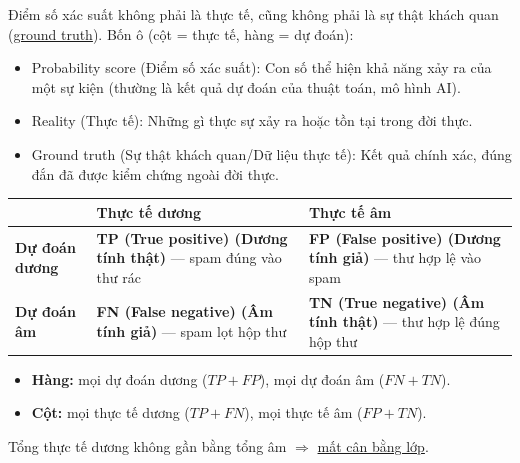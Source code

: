 \documentclass[12pt,a4paper]{article}
\begin{document}
\begin{dinhnghia}[title={Confusion matrix}]
  Điểm số xác suất không phải là thực tế, cũng không phải là sự thật khách quan (\href{https://developers.google.com/machine-learning/glossary\#ground_truth}{ground truth}). Bốn ô (cột = thực tế, hàng = dự đoán):
  \begin{itemize}
    \item Probability score (Điểm số xác suất): Con số thể hiện khả năng xảy ra của một sự kiện (thường là kết quả dự đoán của thuật toán, mô hình AI).
    \item Reality (Thực tế): Những gì thực sự xảy ra hoặc tồn tại trong đời thực.
    \item Ground truth (Sự thật khách quan/Dữ liệu thực tế): Kết quả chính xác, đúng đắn đã được kiểm chứng ngoài đời thực.
  \end{itemize}
\end{dinhnghia}

\begin{congthuc}[title={Ma trận nhầm lẫn (spam)}]
\begin{tabularx}{\textwidth}{@{}l >{\raggedright\arraybackslash}X >{\raggedright\arraybackslash}X@{}}
 & \textbf{Thực tế dương} & \textbf{Thực tế âm} \\
\midrule
\textbf{Dự đoán dương} &
\textbf{TP (True positive) (Dương tính thật)} --- spam đúng vào thư rác &
\textbf{FP (False positive) (Dương tính giả)} --- thư hợp lệ vào spam \\
\textbf{Dự đoán âm} &
\textbf{FN (False negative) (Âm tính giả)} --- spam lọt hộp thư &
\textbf{TN (True negative) (Âm tính thật)} --- thư hợp lệ đúng hộp thư \\
\end{tabularx}
\end{congthuc}

\begin{tinhchat}[title={Tổng theo hàng và cột}]
\begin{itemize}
  \item \textbf{Hàng:} mọi dự đoán dương ($TP+FP$), mọi dự đoán âm ($FN+TN$).
  \item \textbf{Cột:} mọi thực tế dương ($TP+FN$), mọi thực tế âm ($FP+TN$).
\end{itemize}
\end{tinhchat}

\begin{vidu}[title={Dữ liệu mất cân bằng}]
Tổng thực tế dương không gần bằng tổng âm $\Rightarrow$ \href{https://developers.google.com/machine-learning/glossary\#class_imbalanced_data_set}{mất cân bằng lớp}.
\end{vidu}
\end{document}
